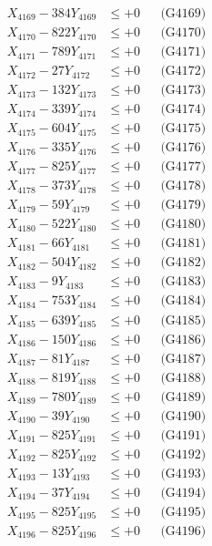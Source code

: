 \documentclass[a4paper,10pt]{article}
\begin{document}
{\begin{align}
X_{4169} - 384Y_{4169} &\leq +0 && \text{(G4169)} \\
X_{4170} - 822Y_{4170} &\leq +0 && \text{(G4170)} \\
\allowbreak
X_{4171} - 789Y_{4171} &\leq +0 && \text{(G4171)} \\
X_{4172} - 27Y_{4172} &\leq +0 && \text{(G4172)} \\
X_{4173} - 132Y_{4173} &\leq +0 && \text{(G4173)} \\
X_{4174} - 339Y_{4174} &\leq +0 && \text{(G4174)} \\
X_{4175} - 604Y_{4175} &\leq +0 && \text{(G4175)} \\
X_{4176} - 335Y_{4176} &\leq +0 && \text{(G4176)} \\
X_{4177} - 825Y_{4177} &\leq +0 && \text{(G4177)} \\
X_{4178} - 373Y_{4178} &\leq +0 && \text{(G4178)} \\
X_{4179} - 59Y_{4179} &\leq +0 && \text{(G4179)} \\
X_{4180} - 522Y_{4180} &\leq +0 && \text{(G4180)} \\
\allowbreak
X_{4181} - 66Y_{4181} &\leq +0 && \text{(G4181)} \\
X_{4182} - 504Y_{4182} &\leq +0 && \text{(G4182)} \\
X_{4183} - 9Y_{4183} &\leq +0 && \text{(G4183)} \\
X_{4184} - 753Y_{4184} &\leq +0 && \text{(G4184)} \\
X_{4185} - 639Y_{4185} &\leq +0 && \text{(G4185)} \\
X_{4186} - 150Y_{4186} &\leq +0 && \text{(G4186)} \\
X_{4187} - 81Y_{4187} &\leq +0 && \text{(G4187)} \\
X_{4188} - 819Y_{4188} &\leq +0 && \text{(G4188)} \\
X_{4189} - 780Y_{4189} &\leq +0 && \text{(G4189)} \\
X_{4190} - 39Y_{4190} &\leq +0 && \text{(G4190)} \\
\allowbreak
X_{4191} - 825Y_{4191} &\leq +0 && \text{(G4191)} \\
X_{4192} - 825Y_{4192} &\leq +0 && \text{(G4192)} \\
X_{4193} - 13Y_{4193} &\leq +0 && \text{(G4193)} \\
X_{4194} - 37Y_{4194} &\leq +0 && \text{(G4194)} \\
X_{4195} - 825Y_{4195} &\leq +0 && \text{(G4195)} \\
X_{4196} - 825Y_{4196} &\leq +0 && \text{(G4196)} \\

\end{align}}
\end{document}
